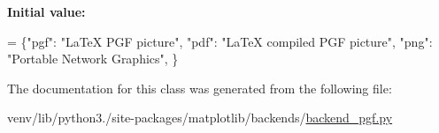 {\bfseries Initial value\+:}
\begin{DoxyCode}
=  \{\textcolor{stringliteral}{"pgf"}: \textcolor{stringliteral}{"LaTeX PGF picture"},
                 \textcolor{stringliteral}{"pdf"}: \textcolor{stringliteral}{"LaTeX compiled PGF picture"},
                 \textcolor{stringliteral}{"png"}: \textcolor{stringliteral}{"Portable Network Graphics"}, \}
\end{DoxyCode}


The documentation for this class was generated from the following file\+:\begin{DoxyCompactItemize}
\item 
venv/lib/python3./site-\/packages/matplotlib/backends/\hyperlink{backend__pgf_8py}{backend\+\_\+pgf.\+py}\end{DoxyCompactItemize}

